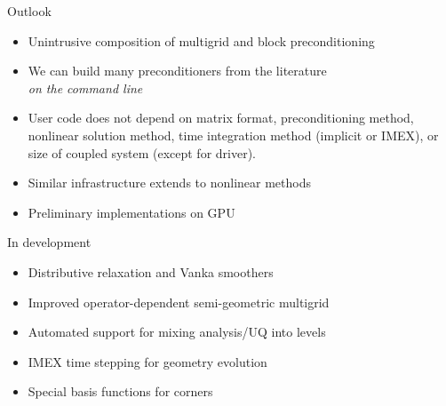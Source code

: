 \documentclass{beamer}
\begin{document}
%




%






\begin{frame}{Outlook}
  \begin{itemize}
  \item Unintrusive composition of multigrid and block preconditioning
  \item We can build many preconditioners from the literature \\
    \emph{on the command line}
  \item User code does not depend on matrix format, preconditioning method, nonlinear solution method, time integration method (implicit or IMEX), or size of coupled system (except for driver).
  \item Similar infrastructure extends to nonlinear methods
  \item Preliminary implementations on GPU
  \end{itemize}
  \begin{block}{In development}
    \begin{itemize}
    \item Distributive relaxation and Vanka smoothers
    \item Improved operator-dependent semi-geometric multigrid
    \item Automated support for mixing analysis/UQ into levels
    \item IMEX time stepping for geometry evolution
    \item Special basis functions for corners
  \end{itemize}
\end{block}
\end{frame}
\end{document}
